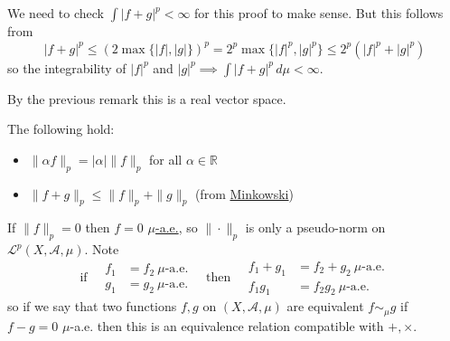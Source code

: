 \documentclass{article}
\newcommand{\1}[1]{\mathbbm{1}_{#1}}
\begin{document}
\begin{remark}
    We need to check $\int |f+g|^p < \infty$ for this proof to make sense. But this follows from
    \begin{equation*}
        |f+g|^p \leq (2 \max\{|f|,|g|\})^p = 2^p \max \{|f|^p,|g|^p\} \leq 2^p (|f|^p + |g|^p)
    \end{equation*}
    so the integrability of $|f|^p$ and $|g|^p \implies \int |f+g|^p \, d\mu < \infty$.
\end{remark}
By the previous remark this is a real vector space.
The following hold:
\begin{itemize}
    \item $\|\alpha f \|_p = |\alpha| \|f\|_p$ for all $\alpha \in \mathbb{R}$
    \item $\|f+g\|_p \leq \|f\|_p + \|g\|_p$ (from \hyperlink{prop:mink}{Minkowski})
\end{itemize}
\begin{remark}
    If $\|f\|_p = 0$ then $f=0$ \hyperlink{def:ae}{$\mu$-a.e.}, so $\|\cdot\|_p$ is only a pseudo-norm on $\mathcal{L}^p(X, \mathcal{A},\mu)$.
    Note
    \begin{equation*}
        \text{if} \quad
        \begin{aligned}
            f_1 &= f_2\ \mu\text{-a.e.}\\
            g_1 &= g_2\ \mu\text{-a.e.}
        \end{aligned}
        \quad \text{then} \quad
        \begin{aligned}
            f_1+g_1 &= f_2+g_2\ \mu\text{-a.e.}\\
            f_1 g_1 &= f_2 g_2\ \mu\text{-a.e.}
        \end{aligned}
    \end{equation*}
    so if we say that two functions $f,g$ on $(X,\mathcal{A},\mu)$ are equivalent $f \sim_\mu g$ if $f-g = 0$ $\mu$-a.e. then this is an equivalence relation compatible with $+,\times$.
\end{remark}
\end{document}

